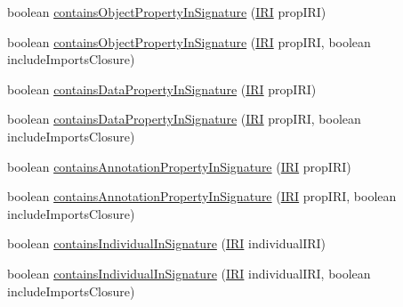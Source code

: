 \begin{DoxyCompactItemize}
\item 
boolean \hyperlink{classuk_1_1ac_1_1manchester_1_1cs_1_1owl_1_1owlapi_1_1_o_w_l_ontology_impl_a989984258e7260fd662226c33804267e}{contains\-Object\-Property\-In\-Signature} (\hyperlink{classorg_1_1semanticweb_1_1owlapi_1_1model_1_1_i_r_i}{I\-R\-I} prop\-I\-R\-I)
\item 
boolean \hyperlink{classuk_1_1ac_1_1manchester_1_1cs_1_1owl_1_1owlapi_1_1_o_w_l_ontology_impl_a3905a3c0b05b45671d1687f2fa4b0f24}{contains\-Object\-Property\-In\-Signature} (\hyperlink{classorg_1_1semanticweb_1_1owlapi_1_1model_1_1_i_r_i}{I\-R\-I} prop\-I\-R\-I, boolean include\-Imports\-Closure)
\item 
boolean \hyperlink{classuk_1_1ac_1_1manchester_1_1cs_1_1owl_1_1owlapi_1_1_o_w_l_ontology_impl_a136bc2f5fb1c425e35ffa81391a01bfa}{contains\-Data\-Property\-In\-Signature} (\hyperlink{classorg_1_1semanticweb_1_1owlapi_1_1model_1_1_i_r_i}{I\-R\-I} prop\-I\-R\-I)
\item 
boolean \hyperlink{classuk_1_1ac_1_1manchester_1_1cs_1_1owl_1_1owlapi_1_1_o_w_l_ontology_impl_a2496c634bf8c722f098c4ccdb85a25a6}{contains\-Data\-Property\-In\-Signature} (\hyperlink{classorg_1_1semanticweb_1_1owlapi_1_1model_1_1_i_r_i}{I\-R\-I} prop\-I\-R\-I, boolean include\-Imports\-Closure)
\item 
boolean \hyperlink{classuk_1_1ac_1_1manchester_1_1cs_1_1owl_1_1owlapi_1_1_o_w_l_ontology_impl_a651f5adee264a1b4311aafa7a43da96b}{contains\-Annotation\-Property\-In\-Signature} (\hyperlink{classorg_1_1semanticweb_1_1owlapi_1_1model_1_1_i_r_i}{I\-R\-I} prop\-I\-R\-I)
\item 
boolean \hyperlink{classuk_1_1ac_1_1manchester_1_1cs_1_1owl_1_1owlapi_1_1_o_w_l_ontology_impl_a9b4a2c53e26a3643b45e824d40dd142b}{contains\-Annotation\-Property\-In\-Signature} (\hyperlink{classorg_1_1semanticweb_1_1owlapi_1_1model_1_1_i_r_i}{I\-R\-I} prop\-I\-R\-I, boolean include\-Imports\-Closure)
\item 
boolean \hyperlink{classuk_1_1ac_1_1manchester_1_1cs_1_1owl_1_1owlapi_1_1_o_w_l_ontology_impl_ac3fc43d05a6f84766b4bc1c3d309d4f9}{contains\-Individual\-In\-Signature} (\hyperlink{classorg_1_1semanticweb_1_1owlapi_1_1model_1_1_i_r_i}{I\-R\-I} individual\-I\-R\-I)
\item 
boolean \hyperlink{classuk_1_1ac_1_1manchester_1_1cs_1_1owl_1_1owlapi_1_1_o_w_l_ontology_impl_aa7a3ed9338574caa29a66f35201a3199}{contains\-Individual\-In\-Signature} (\hyperlink{classorg_1_1semanticweb_1_1owlapi_1_1model_1_1_i_r_i}{I\-R\-I} individual\-I\-R\-I, boolean include\-Imports\-Closure)

\end{DoxyCompactItemize}
